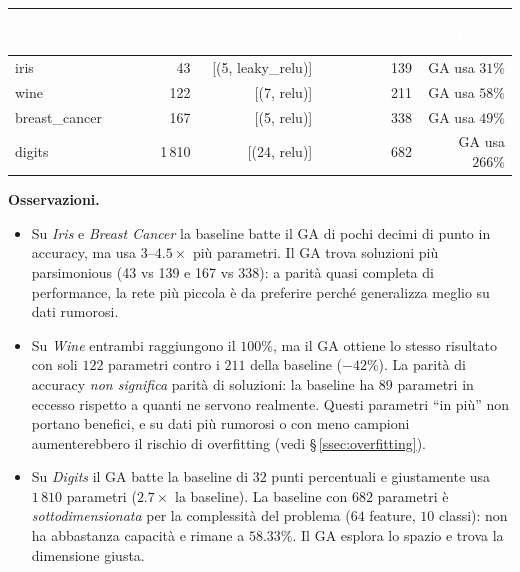 \documentclass[11pt,a4paper]{article}
\begin{document}
\begin{center}
\begin{tabular}{lrrlrr}
    \toprule
    \rowcolor{headerblue}
    \textcolor{white}{\textbf{dataset}} &
    \textcolor{white}{\textbf{params GA}} &
    \textcolor{white}{\textbf{architettura GA}} &
    \textcolor{white}{\textbf{}} &
    \textcolor{white}{\textbf{params BL}} &
    \textcolor{white}{\textbf{rapporto}} \\
    \midrule
    iris           &  43  & [(5, leaky\_relu)]  & & 139  & GA usa $31\%$  \\
    \rowcolor{rowgray}
    wine           & 122  & [(7, relu)]         & & 211  & GA usa $58\%$  \\
    breast\_cancer & 167  & [(5, relu)]         & & 338  & GA usa $49\%$  \\
    \rowcolor{rowgray}
    digits         & 1\,810 & [(24, relu)]      & & 682  & GA usa $266\%$ \\
    \bottomrule
\end{tabular}
\end{center}

\textbf{Osservazioni.}
\begin{itemize}
    \item Su \emph{Iris} e \emph{Breast Cancer} la baseline batte il GA
          di pochi decimi di punto in accuracy, ma usa $3$--$4.5\times$
          più parametri. Il GA trova soluzioni più parsimonious (43 vs 139
          e 167 vs 338): a parità quasi completa di performance, la rete
          più piccola è da preferire perché generalizza meglio su dati
          rumorosi.
    \item Su \emph{Wine} entrambi raggiungono il $100\%$, ma il GA ottiene
          lo stesso risultato con soli $122$ parametri contro i $211$ della
          baseline ($-42\%$). La parità di accuracy \emph{non significa}
          parità di soluzioni: la baseline ha $89$ parametri in eccesso
          rispetto a quanti ne servono realmente. Questi parametri ``in
          più'' non portano benefici, e su dati più rumorosi o con meno
          campioni aumenterebbero il rischio di overfitting (vedi
          \S\,\ref{ssec:overfitting}).
    \item Su \emph{Digits} il GA batte la baseline di $32$ punti
          percentuali e giustamente usa $1\,810$ parametri ($2.7\times$
          la baseline). La baseline con $682$ parametri è
          \emph{sottodimensionata} per la complessità del problema
          ($64$ feature, $10$ classi): non ha abbastanza capacità e
          rimane a $58.33\%$. Il GA esplora lo spazio e trova la
          dimensione giusta.
\end{itemize}
\end{document}
